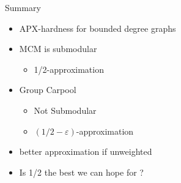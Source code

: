 \begin{frame}{Summary}
\begin{itemize}[<+->]
  \item APX-hardness for bounded degree graphs
  \item \alert{MCM is submodular}
  	\begin{itemize}
  	\item 1/2-approximation
	\end{itemize}
  \item Group Carpool
  	\begin{itemize}
  	  \item Not Submodular
  	  \item $(1/2-\varepsilon)$-approximation
	\end{itemize}
  \item \alert{better approximation if unweighted}
  \item Is 1/2 the best we can hope for ?
\end{itemize}
\end{frame}